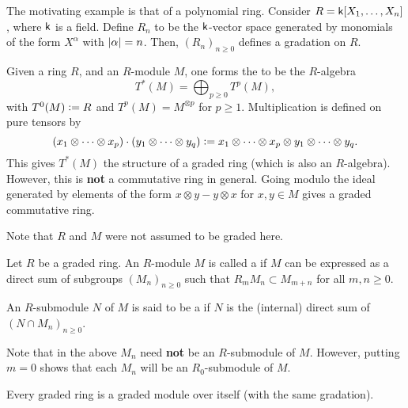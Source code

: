 \begin{ex}
	The motivating example is that of a polynomial ring. Consider $R = \mathsf{k}[X_{1}, \ldots, X_{n}]$, where $\mathsf{k}$ is a field. Define $R_{n}$ to be the $\mathsf{k}$-vector space generated by monomials of the form $X^{\alpha}$ with ${\left\lvert \alpha \right\lvert} = n$. Then, $(R_{n})_{n \ge 0}$ defines a gradation on $R$.
\end{ex}

\begin{ex}
	Given a ring $R$, and an $R$-module $M$, one forms the  to be the $R$-algebra
	\begin{equation*} 
		T^{\ast}(M) = \bigoplus_{p \ge 0} T^{p}(M),
	\end{equation*}
	with $T^{0}(M) \vcentcolon= R$ and $T^{p}(M) = M^{\otimes p}$ for $p \ge 1$. Multiplication is defined on pure tensors by
	\begin{equation*} 
		(x_{1} \otimes \cdots \otimes x_{p}) \cdot (y_{1} \otimes \cdots \otimes y_{q}) \vcentcolon= x_{1} \otimes \cdots \otimes x_{p} \otimes y_{1} \otimes \cdots \otimes y_{q}.
	\end{equation*}
	This gives $T^{\ast}(M)$ the structure of a graded ring (which is also an $R$-algebra). However, this is \textbf{not} a commutative ring in general. Going modulo the ideal generated by elements of the form $x \otimes y - y \otimes x$ for $x, y \in M$ gives a graded commutative ring.

	Note that $R$ and $M$ were not assumed to be graded here.
\end{ex}

\begin{defn}
	Let $R$ be a graded ring. An $R$-module $M$ is called a  if $M$ can be expressed as a direct sum of subgroups $(M_{n})_{n \ge 0}$ such that $R_{m} M_{n} \subset M_{m + n}$ for all $m, n \ge 0$.

	An $R$-submodule $N$ of $M$ is said to be a  if $N$ is the (internal) direct sum of $(N \cap M_{n})_{n \ge 0}$.
\end{defn}

\begin{rem}
	Note that in the above $M_{n}$ need \textbf{not} be an $R$-submodule of $M$. However, putting $m = 0$ shows that each $M_{n}$ will be an $R_{0}$-submodule of $M$.
\end{rem}

\begin{ex}
	Every graded ring is a graded module over itself (with the same gradation).
\end{ex}

